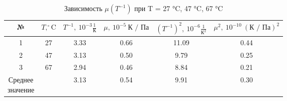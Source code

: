 \documentclass[a4paper, 10pt, twocolumn]{article}
\begin{document}
\begin{table}[H]
    \centering
    \begin{tabular}{|c|c|c|c|c|c|} \hline
    № & $T, ^\circ\text{C}$ & $T^{-1},~10^{-3}\frac{1}{\text{К}}$ & $\mu,~10^{-5}~\text{К / Па}$ & $\left(T^{-1}\right)^2,~10^{-6}\frac{1}{\text{К}^2}$ & $\mu^2,~10^{-10}~\left(\text{К / Па}\right)^2$ \\ \hline
    1 & 27 & 3.33 & 0.66 & 11.09 &  0.44\\ \hline
    2 & 47 & 3.13 & 0.50 & 9.79  &  0.25\\ \hline
    3 & 67 & 2.94 & 0.46 & 8.84  &  0.21\\ \hline
    \shortstack{Среднее \\ значение} & & 3.13 & 0.54 & 9.91 & 0.30\\ \hline

    \end{tabular}
    \caption{Зависимость $\mu(T^{-1})$ при T = 27 °C, 47 °C, 67 °C}
\end{table}
\end{document}
